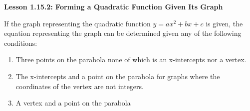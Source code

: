 \begin{center}
\textbf{Lesson 1.15.2: Forming a Quadratic Function Given Its Graph}
\end{center}


If the graph representing the quadratic function $y = ax^{2} + bx + c$ is given, the 
equation representing the graph can be determined given any of the following conditions:
\begin{enumerate}[label = \color{blue}\alph*. ]
\item Three points on the parabola none of which is an x-intercepts nor a vertex.
\item The x-intercepts and a point on the parabola for graphs where the coordinates of the vertex are not integers.
\item A vertex and a point on the parabola
\end{enumerate}

